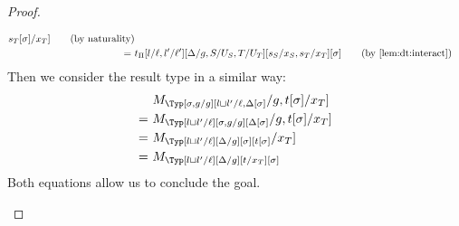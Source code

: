 \begin{proof}
\begin{itemize}[label=Case]
\begin{align*}
          s_T[\sigma]/x_T]
          \tag{by naturality} \\
      =~& t_\Pi[l/\ell,l'/\ell'][\Delta/g,S/U_S,T/U_T][s_S/x_S, s_T/x_T][\sigma]
          \tag{by \Cref{lem:dt:interact}}
    \end{align*}
    Then we consider the result type in a similar way:
    \begin{align*}
      & M_\Typ[\sigma,g/g][l\sqcup l'/\ell,\Delta[\sigma]/g,t[\sigma]/x_T] \\
      =~& M_\Typ[l\sqcup l'/\ell][\sigma,g/g][\Delta[\sigma]/g,t[\sigma]/x_T] \\
      =~& M_\Typ[l\sqcup l'/\ell][\Delta/g][\sigma][t[\sigma]/x_T] \\
      =~& M_\Typ[l\sqcup l'/\ell][\Delta/g][t/x_T][\sigma]
    \end{align*}
    Both equations allow us to conclude the goal. 
  \end{itemize}
\end{proof}

